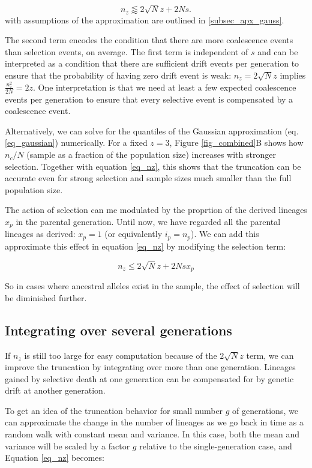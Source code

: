 \documentclass[review]{elsarticle}
\begin{document}
\begin{equation}
  n_z \lessapprox 2 \sqrt{N} z + 2N s.
\label{eq_nz}
\end{equation}
with assumptions of the approximation are outlined in \ref{subsec_apx_gauss}. 

The second term
encodes the condition that there are more coalescence events than selection events, on average. The
first term is independent of $s$ and can be interpreted as a condition that there are sufficient
drift events per generation to ensure that the probability of having zero drift event is weak: $n_z
= 2 \sqrt N z$ implies $\frac{n_z^2}{2N}= 2 z$. One interpretation is that we need at least a few
expected coalescence events per generation to ensure that every selective event is compensated by a
coalescence event. 

Alternatively, we can solve for the quantiles of the Gaussian approximation (eq. \ref{eq_gaussian})
numerically. For a fixed $z=3$, Figure \ref{fig_combined}B shows how $n_c/N$ (sample as a fraction
of the population size) increases with stronger selection. Together with equation \ref{eq_nz}, this shows
that the truncation can be accurate even for strong selection and sample sizes much smaller than
the full population size. 

The action of selection can me modulated by the proprtion of the derived lineages $x_p$ in the
parental generation. Until now, we have regarded all the parental lineages as derived: $x_p=1$ (or
equivalently  $i_p = n_p$). We can add this approximate this effect in equation \eqref{eq_nz} by
modifying the selection term:

\begin{equation*}
  n_z \leq 2 \sqrt{N} z + 2Nsx_p
\end{equation*}

So in cases where ancestral alleles exist in the sample, the effect of selection will be
diminished further.

\subsection{Integrating over several generations} 

If $n_z$ is still too large for easy computation because of the $2 \sqrt{N} z$ term, we can improve 
the truncation by integrating over more than one generation.
Lineages gained by selective death at one generation can be compensated for by genetic drift at
another generation.

To get an idea of the truncation behavior for small number $g$ of generations, we can approximate 
the change  in the number of lineages as we go back in time as a random walk with constant mean and 
variance. In this case, both the mean and variance will be scaled by a factor $g$ relative 
to the single-generation case, and Equation \eqref{eq_nz} becomes:
\end{document}
